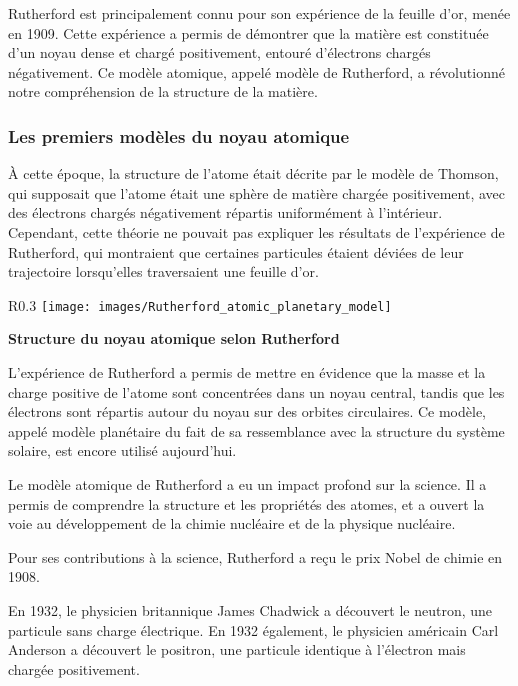 Rutherford est principalement connu pour son expérience de la feuille d'or, menée en 1909. Cette expérience a permis de démontrer que la matière est constituée d'un noyau dense et chargé positivement, entouré d'électrons chargés négativement. Ce modèle atomique, appelé modèle de Rutherford, a révolutionné notre compréhension de la structure de la matière.

\subsubsection{Les premiers modèles du noyau atomique}

À cette époque, la structure de l'atome était décrite par le modèle de Thomson, qui supposait que l'atome était une sphère de matière chargée positivement, avec des électrons chargés négativement répartis uniformément à l'intérieur. Cependant, cette théorie ne pouvait pas expliquer les résultats de l'expérience de Rutherford, qui montraient que certaines particules  étaient déviées de leur trajectoire lorsqu'elles traversaient une feuille d'or.

\begin{wrapfigure}[12]{R}{0.3\textwidth}
    \texttt{[image: images/Rutherford\_atomic\_planetary\_model]}
    \begin{center}
        \bfseries Structure du noyau atomique selon Rutherford
    \end{center}
\end{wrapfigure}

L'expérience de Rutherford a permis de mettre en évidence que la masse et la charge positive de l'atome sont concentrées dans un noyau central, tandis que les électrons sont répartis autour du noyau sur des orbites circulaires. Ce modèle, appelé modèle planétaire du fait de sa ressemblance avec la structure du système solaire, est encore utilisé aujourd'hui.

Le modèle atomique de Rutherford a eu un impact profond sur la science. Il a permis de comprendre la structure et les propriétés des atomes, et a ouvert la voie au développement de la chimie nucléaire et de la physique nucléaire.

Pour ses contributions à la science, Rutherford a reçu le prix Nobel de chimie en 1908.

En 1932, le physicien britannique James Chadwick a découvert le neutron, une particule sans charge électrique. En 1932 également, le physicien américain Carl Anderson a découvert le positron, une particule identique à l'électron mais chargée positivement.


